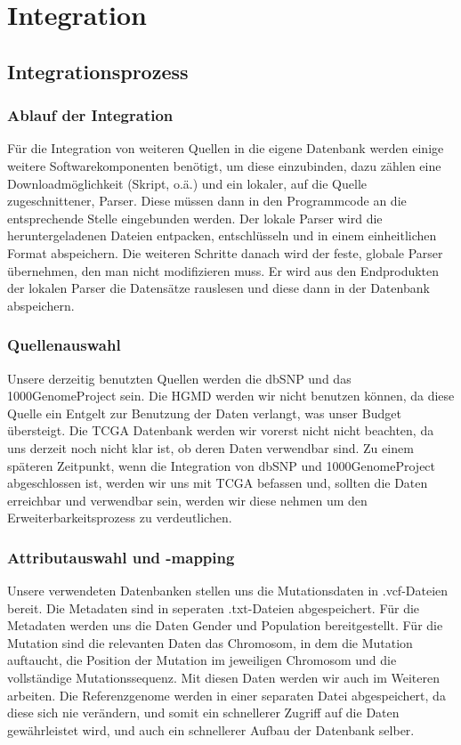 
\section{Integration}
\subsection{Integrationsprozess}
\subsubsection{Ablauf der Integration}
Für die Integration von weiteren Quellen in die eigene Datenbank werden einige weitere Softwarekomponenten benötigt, um diese einzubinden, dazu zählen eine Downloadmöglichkeit (Skript, o.ä.) und ein lokaler, auf die Quelle zugeschnittener, Parser. Diese müssen dann in den Programmcode an die entsprechende Stelle eingebunden werden. Der lokale Parser wird die heruntergeladenen Dateien entpacken, entschlüsseln und in einem einheitlichen Format abspeichern. Die weiteren Schritte danach wird der feste, globale Parser übernehmen, den man nicht modifizieren muss. Er wird aus den Endprodukten der lokalen Parser die Datensätze rauslesen und diese dann in der Datenbank abspeichern.
\subsubsection{Quellenauswahl}
Unsere derzeitig benutzten Quellen werden die dbSNP und das 1000GenomeProject sein. Die HGMD werden wir nicht benutzen können, da diese Quelle ein Entgelt zur Benutzung der Daten verlangt, was unser Budget übersteigt. Die TCGA Datenbank werden wir vorerst nicht nicht beachten, da uns derzeit noch nicht klar ist, ob deren Daten verwendbar sind. Zu einem späteren Zeitpunkt, wenn die Integration von dbSNP und 1000GenomeProject abgeschlossen ist, werden wir uns mit TCGA befassen und, sollten die Daten erreichbar und verwendbar sein, werden wir diese nehmen um den Erweiterbarkeitsprozess zu verdeutlichen.
\subsubsection{Attributauswahl und -mapping}
Unsere verwendeten Datenbanken stellen uns die Mutationsdaten in .vcf-Dateien bereit. Die Metadaten sind in seperaten .txt-Dateien abgespeichert. Für die Metadaten werden uns die Daten Gender und Population bereitgestellt. Für die Mutation sind die relevanten Daten das Chromosom, in dem die Mutation auftaucht, die Position der Mutation im jeweiligen Chromosom und die vollständige Mutationssequenz. Mit diesen Daten werden wir auch im Weiteren arbeiten. Die Referenzgenome werden in einer separaten Datei abgespeichert, da diese sich nie verändern, und somit ein schnellerer Zugriff auf die Daten gewährleistet wird, und auch ein schnellerer Aufbau der Datenbank selber.
